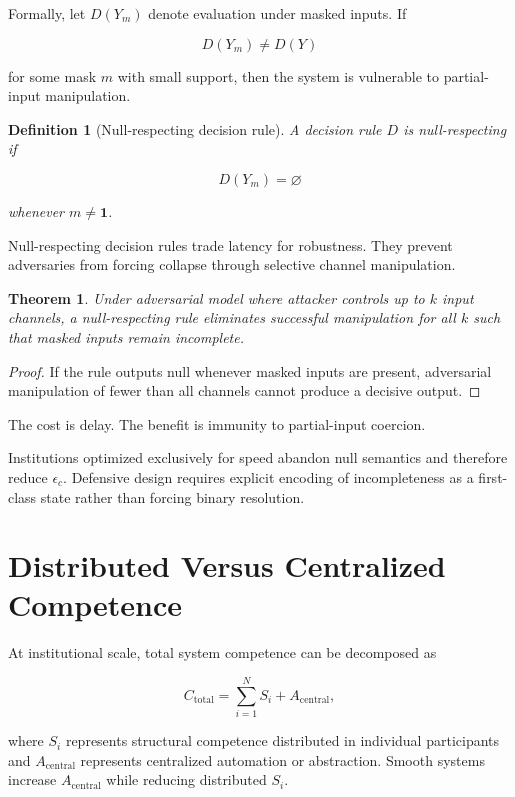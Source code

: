 \documentclass[11pt]{article}
\newtheorem{theorem}{Theorem}
\newtheorem{definition}{Definition}
\theoremstyle{remark}
\begin{document}
Formally, let $D(Y_m)$ denote evaluation under masked inputs. If

\[
D(Y_m) \neq D(Y)
\]

for some mask $m$ with small support, then the system is vulnerable to partial-input manipulation.

\begin{definition}[Null-respecting decision rule]
A decision rule $D$ is null-respecting if

\[
D(Y_m) = \varnothing
\]

whenever $m \neq \mathbf{1}$.
\end{definition}

Null-respecting decision rules trade latency for robustness. They prevent adversaries from forcing collapse through selective channel manipulation.

\begin{theorem}
Under adversarial model where attacker controls up to $k$ input channels, a null-respecting rule eliminates successful manipulation for all $k$ such that masked inputs remain incomplete.
\end{theorem}

\begin{proof}
If the rule outputs null whenever masked inputs are present, adversarial manipulation of fewer than all channels cannot produce a decisive output.
\end{proof}

The cost is delay. The benefit is immunity to partial-input coercion.

Institutions optimized exclusively for speed abandon null semantics and therefore reduce $\epsilon_c$. Defensive design requires explicit encoding of incompleteness as a first-class state rather than forcing binary resolution.

\section{Distributed Versus Centralized Competence}
\label{sec:distributed}

At institutional scale, total system competence can be decomposed as

\[
C_{\text{total}} = \sum_{i=1}^N S_i + A_{\text{central}},
\]

where $S_i$ represents structural competence distributed in individual participants and $A_{\text{central}}$ represents centralized automation or abstraction. Smooth systems increase $A_{\text{central}}$ while reducing distributed $S_i$.
\end{document}
